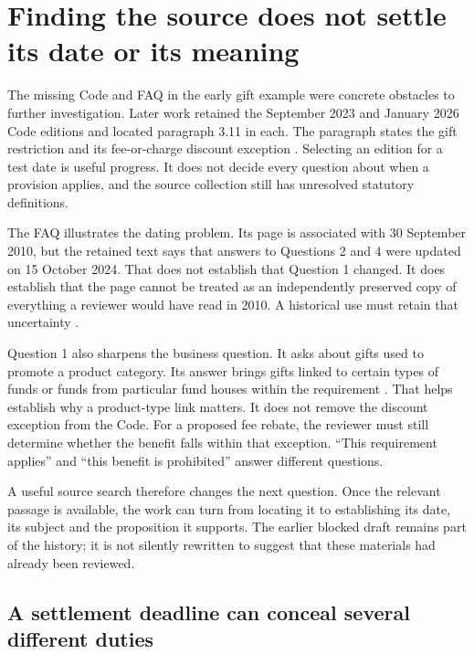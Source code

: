 \documentclass[12pt,a4paper,oneside,openany]{book}
\begin{document}
\section{Finding the source does not settle its date or its meaning}
\label{sec:retrieved-authority}

The missing Code and FAQ in the early gift example were concrete obstacles to
further investigation. Later work retained the September 2023 and January 2026
Code editions and located paragraph 3.11 in each. The paragraph states the gift
restriction and its fee-or-charge discount exception
\citep[para.~3.11]{sfccode2023,sfccode2026}. Selecting an edition for a test date
is useful progress. It does not decide every question about when a provision
applies, and the source collection still has unresolved statutory definitions.

The FAQ illustrates the dating problem. Its page is associated
with 30 September 2010, but the retained text says that answers to Questions 2
and 4 were updated on 15 October 2024. That does not establish that Question 1
changed. It does establish that the page cannot be treated as an independently
preserved copy of everything a reviewer would have read in 2010. A historical
use must retain that uncertainty \citep{sfcgiftfaq}.

Question 1 also sharpens the business question. It asks about gifts used to
promote a product category. Its answer brings gifts linked to certain types of
funds or funds from particular fund houses within the requirement
\citep[Question 1, answer and section reference]{sfcgiftfaq}. That helps establish
why a product-type link matters. It does not remove the discount exception from
the Code. For a proposed fee rebate, the reviewer must still determine whether
the benefit falls within that exception. ``This requirement applies'' and
``this benefit is prohibited'' answer different questions.

A useful source search therefore changes the next question. Once the relevant
passage is available, the work can turn from locating it to establishing its
date, its subject and the proposition it supports. The earlier blocked draft
remains part of the history; it is not silently rewritten to suggest that these
materials had already been reviewed.

\subsection{A settlement deadline can conceal several different duties}
\label{sec:settlement-readiness}
\end{document}
